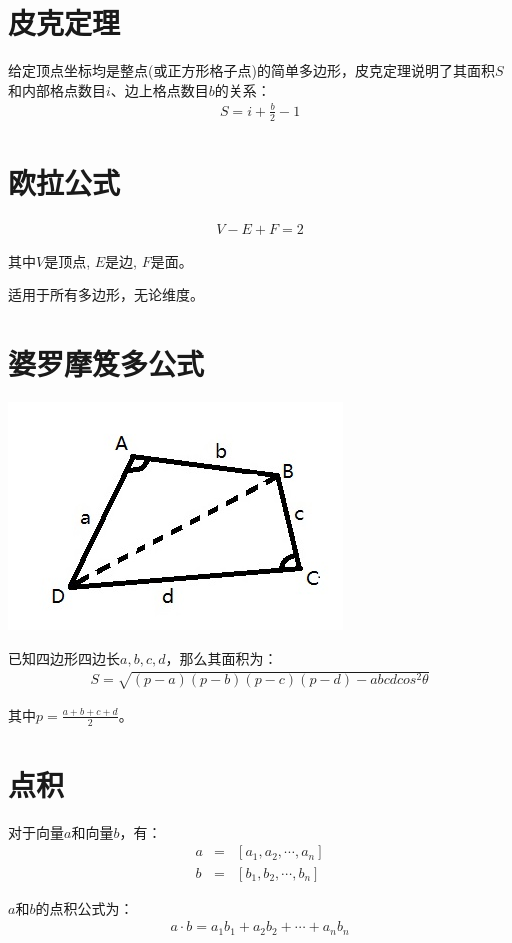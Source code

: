 \section{皮克定理}
给定顶点坐标均是整点(或正方形格子点)的简单多边形，皮克定理说明了其面积$S$和内部格点数目$i$、边上格点数目$b$的关系：
\begin{eqnarray*}
S = i + \frac{b}{2} - 1
\end{eqnarray*}

\section{欧拉公式}
\begin{eqnarray*}
V - E + F = 2
\end{eqnarray*}\par
其中$V$是顶点, $E$是边, $F$是面。\par
适用于所有多边形，无论维度。\par

\section{婆罗摩笈多公式}
\begin{center}
\includegraphics[scale=0.65]{images/Snipaste_2019-09-28_15-09-51.png} %
\end{center}
已知四边形四边长$a, b, c, d$，那么其面积为：
\begin{eqnarray*}
S = \sqrt{(p - a)(p - b)(p - c)(p - d) - abcdcos^2\theta}
\end{eqnarray*}\par
其中$p = \frac{a + b + c + d}{2}$。

\section{点积}
对于向量$a$和向量$b$，有：
\begin{eqnarray*}
	a &=& [a_1, a_2, \cdots, a_n] \\
	b &=& [b_1, b_2, \cdots, b_n]
\end{eqnarray*} \par
$a$和$b$的点积公式为：
\begin{eqnarray*}
	a \cdot b = a_1b_1 + a_2b_2 + \cdots + a_nb_n
\end{eqnarray*} \par

